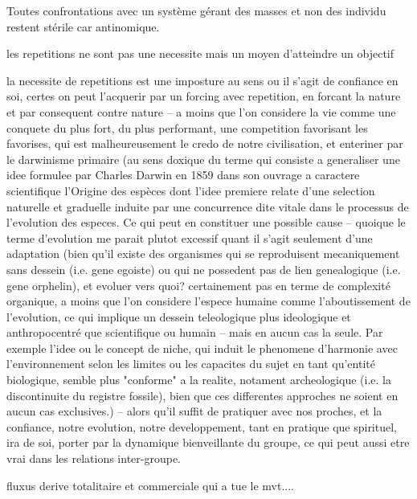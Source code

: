 \documentclass{article}
\begin{document}
Toutes confrontations avec un système gérant des masses et non des individu restent stérile car antinomique.

les repetitions ne sont pas une necessite mais un moyen d'atteindre un objectif
 
la necessite de repetitions est une imposture au sens ou il s'agit de confiance en soi, certes on peut l'acquerir par un forcing avec repetition, en forcant la nature et par consequent contre nature -- a moins que l'on considere la vie comme une conquete du plus fort, du plus performant, une competition favorisant les favorises, qui est malheureusement le credo de notre civilisation, et enteriner par le darwinisme primaire (au sens doxique du terme qui consiste a generaliser une idee formulee par Charles Darwin en 1859 dans son ouvrage a caractere scientifique l'Origine des espèces dont l'idee premiere relate d'une selection naturelle et graduelle induite par une concurrence dite vitale dans le processus de l'evolution des especes. Ce qui peut en constituer une possible cause -- quoique le terme d'evolution me parait plutot excessif quant il s'agit seulement d'une adaptation (bien qu'il existe des organismes qui se reproduisent mecaniquement sans dessein (i.e. gene egoiste) ou qui ne possedent pas de lien genealogique (i.e. gene orphelin), et evoluer vers quoi? certainement pas en terme de complexité organique, a moins que l'on considere l'espece humaine comme l'aboutissement de l'evolution, ce qui implique un dessein teleologique plus ideologique et anthropocentré que scientifique ou humain -- mais en aucun cas la seule. Par exemple l'idee ou le concept de niche, qui induit le phenomene d'harmonie avec l'environnement selon les limites ou les capacites du sujet en tant qu'entité biologique, semble plus "conforme" a la realite, notament archeologique (i.e. la discontinuite du registre fossile), bien que ces differentes approches ne soient en aucun cas exclusives.) -- alors qu'il suffit de pratiquer avec nos proches, et la confiance, notre evolution, notre developpement, tant en pratique que spirituel, ira de soi, porter par la dynamique bienveillante du groupe, ce qui peut aussi etre vrai dans les relations inter-groupe.



fluxus derive totalitaire et commerciale qui a tue le mvt....
\end{document}
